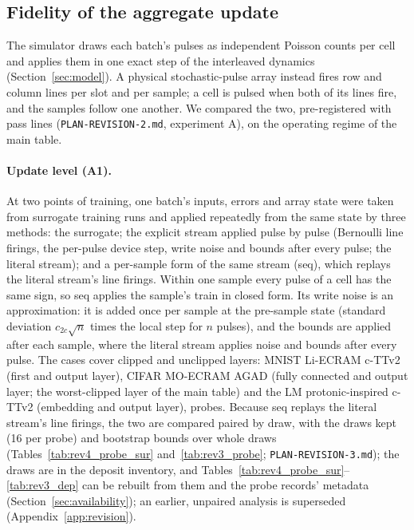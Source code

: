 \subsection{Fidelity of the aggregate update}\label{sec:fidelity}
The simulator draws each batch's pulses as independent Poisson counts per cell and applies them in one exact step of the
interleaved dynamics (Section~\ref{sec:model}). A physical stochastic-pulse array instead fires row and column lines per slot
and per sample; a cell is pulsed when both of its lines fire, and the samples follow one another. We compared the two, pre-registered with pass lines (\texttt{PLAN-REVISION-2.md}, experiment A), on the operating regime of the
main table.

\paragraph{Update level (A1).} At two points of training, one batch's inputs, errors and array state were taken from surrogate
training runs and applied repeatedly from the same state by three methods: the surrogate; the explicit stream applied pulse by
pulse (Bernoulli line firings, the per-pulse device step, write noise and bounds after every pulse; the literal stream); and a
per-sample form of the same stream (seq), which replays the literal stream's line firings. Within one sample every pulse of a
cell has the same sign, so seq applies the sample's train in closed form. Its write noise is an approximation: it is added once
per sample at the pre-sample state (standard deviation $c_{2c}\sqrt{n}$ times the local step for $n$ pulses), and the bounds are
applied after each sample, where the literal stream applies noise and bounds after every pulse. The cases cover clipped and
unclipped layers: MNIST Li-ECRAM c-TTv2 (first and output layer), CIFAR MO-ECRAM AGAD (fully connected and output layer; the
worst-clipped layer of the main table) and the LM protonic-inspired c-TTv2 (embedding and output layer), \RYProbeN{} probes.
Because seq replays the literal stream's line firings, the two are compared paired by draw, with the draws kept (16 per
probe) and bootstrap bounds over whole draws (Tables~\ref{tab:rev4_probe_sur} and~\ref{tab:rev3_probe}; \texttt{PLAN-REVISION-3.md}); the draws are in
the deposit inventory, and Tables~\ref{tab:rev4_probe_sur}--\ref{tab:rev3_dep} can be rebuilt from them and the probe
records' metadata (Section~\ref{sec:availability}); an earlier, unpaired analysis is superseded
(Appendix~\ref{app:revision}).
